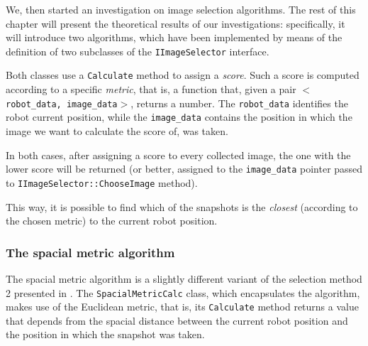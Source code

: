 %
We, then started an investigation on image selection algorithms.
The rest of this chapter will present the theoretical results 
of our investigations: specifically, it will introduce 
two algorithms, which have been implemented by means of 
the definition of two subclasses of the 
\texttt{IImageSelector} interface.
%

%
Both classes use a \texttt{Calculate} method to assign a 
\textit{score}. Such a score is computed according to 
a specific \textit{metric}, that is, a function that, 
given a pair $<$\texttt{robot\_data, image\_data}$>$, 
returns a number. 
%
The \texttt{robot\_data} identifies the robot current position, 
while the \texttt{image\_data} contains the position 
in which the image we want to calculate the score of, 
was taken.
%

%
In both cases, after assigning a score to every collected image, 
the one with the lower score will be returned 
(or better, assigned to the \texttt{image\_data} pointer 
passed to \texttt{IImageSelector::ChooseImage} method).
%

%
This way, it is possible to find which of the snapshots is 
the \textit{closest} (according to the chosen metric) to 
the current robot position.
%
\subsubsection{The spacial metric algorithm}
\label{subsec:spacial_metric_algorithm}
The spacial metric algorithm is a slightly different variant 
of the selection method 2 presented in \cite{sugimoto}.
%
The \texttt{SpacialMetricCalc} class, which encapsulates 
the algorithm, makes use of the Euclidean metric, that is,
its \texttt{Calculate} method returns a value that 
depends from the spacial distance between the current 
robot position and the position in which the snapshot 
was taken.
%


